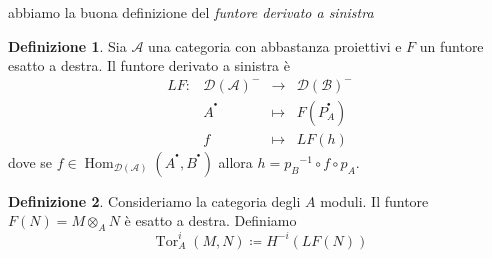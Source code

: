 \documentclass[a4paper,11pt,oneside]{book}
\newcommand{\inverti}[1]{{#1}^{-1}}
\newcommand{\A}{\mathcal{A}}
\newcommand{\B}{\mathcal{B}}
\newcommand{\der}[1]{\mathcal{D}(#1)}
\newcommand{\complx}[1]{#1^{^\bullet}}
\DeclareMathOperator{\Hom}{Hom}
\DeclareMathOperator{\Tor}{Tor}
\theoremstyle{definition}
\newtheorem{de}{Definizione}
\begin{document}
	 abbiamo la buona definizione del \emph{funtore derivato a sinistra}
	 \begin{de}
	 Sia  $\A$ una categoria con abbastanza proiettivi e $F$ un funtore esatto a destra. Il
	 funtore derivato a sinistra è
	\[\begin{matrix}
	   LF\colon &\der\A^-&\longrightarrow &\der\B^-\\
		    &\complx{A}&\longmapsto& F(\complx{P}_A)\\
		    &f&\mapsto & LF(h)
	  \end{matrix}
	\]
	dove se $f\in\Hom_{\der\A}(\complx{A},\complx{B})$ allora
	$h=\inverti{p_B}\circ f\circ {p_A}$.
	\end{de}
	
	\begin{de}
	 Consideriamo la categoria degli $A$ moduli. Il funtore $F(N)=M\otimes_{A}N$ è esatto a destra.
	 Definiamo 
	 \[
	  \Tor^i_{A}(M,N)\coloneqq H^{-i}(LF(N))
	 \]
	\end{de}
\end{document}
